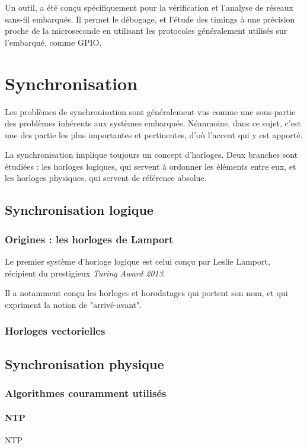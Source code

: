 Un outil,  \cite{lim2013flocklab} a été conçu spécifiquement pour la vérification et l'analyse de réseaux sans-fil embarqués. Il permet le débogage, et l'étude des timings à une précision proche de la microseconde en utilisant les protocoles généralement utilisés sur l'embarqué, comme \ac{GPIO}.  

\section{Synchronisation}
Les problèmes de synchronisation sont généralement vus comme une sous-partie des problèmes inhérents aux systèmes embarqués. Néanmoins, dans ce sujet, c'est une des partie les plus importantes et pertinentes, d'où l'accent qui y est apporté.

La synchronisation implique toujours un concept d'horloges. Deux branches sont étudiées : les horloges logiques, qui servent à ordonner les éléments entre eux, et les horloges physiques, qui servent de référence absolue.

\subsection{Synchronisation logique}
\subsubsection{Origines : les horloges de Lamport}
Le premier système d'horloge logique est celui conçu par Leslie Lamport, récipient du prestigieux \textit{Turing Award 2013}.

Il a notamment conçu les horloges et horodatages qui portent son nom, et qui expriment la notion de "arrivé-avant".
\subsubsection{Horloges vectorielles}

\subsection{Synchronisation physique}
\subsubsection{Algorithmes couramment utilisés}
\paragraph{NTP}
\ac{NTP}
